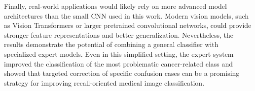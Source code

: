 Finally, real-world applications would likely rely on more advanced model
architectures than the small CNN used in this work. Modern vision models, such
as Vision Transformers or larger pretrained convolutional networks, could
provide stronger feature representations and better generalization.
Nevertheless, the results demonstrate the potential of combining a general
classifier with specialized expert models. Even in this simplified setting, the
expert system improved the classification of the most problematic cancer-related
class and showed that targeted correction of specific confusion cases can be a
promising strategy for improving recall-oriented medical image classification.
